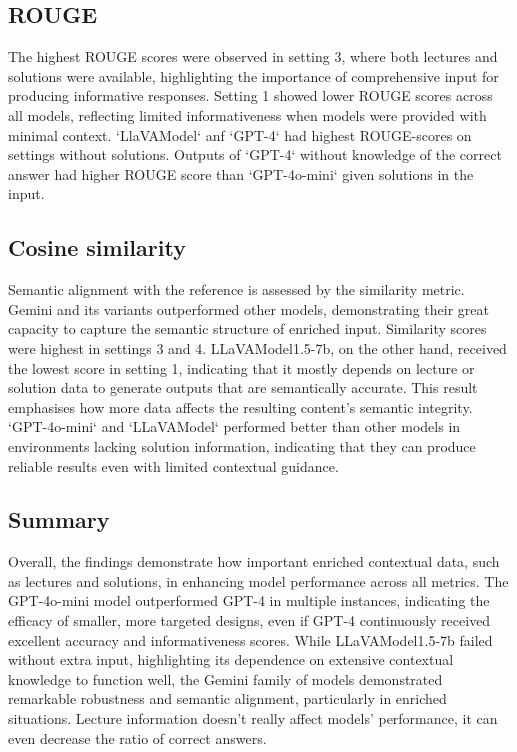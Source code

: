 \documentclass[10pt]{article}
\begin{document}
\subsection{ROUGE}
The highest ROUGE scores were observed in setting 3, where both lectures and solutions were available, highlighting the importance of comprehensive input for producing informative responses. Setting 1 showed lower ROUGE scores across all models, reflecting limited informativeness when models were provided with minimal context.  `LlaVAModel` anf `GPT-4` had highest ROUGE-scores on settings without solutions. Outputs of `GPT-4` without knowledge of the correct answer had higher ROUGE score than `GPT-4o-mini` given solutions in the input.


\subsection{Cosine similarity}
Semantic alignment with the reference is assessed by the similarity metric. Gemini and its variants outperformed other models, demonstrating their great capacity to capture the semantic structure of enriched input. Similarity scores were highest in settings 3 and 4. LLaVAModel1.5-7b, on the other hand, received the lowest score in setting 1, indicating that it mostly depends on lecture or solution data to generate outputs that are semantically accurate. This result emphasises how more data affects the resulting content's semantic integrity. `GPT-4o-mini` and `LLaVAModel` performed better than other models in environments lacking solution information, indicating that they can produce reliable results even with limited  contextual guidance.

\subsection{Summary}
Overall, the findings demonstrate how important enriched contextual data, such as lectures and solutions, in enhancing model performance across all metrics. The GPT-4o-mini model outperformed GPT-4 in multiple instances, indicating the efficacy of smaller, more targeted designs, even if GPT-4 continuously received excellent accuracy and informativeness scores. While LLaVAModel1.5-7b failed without extra input, highlighting its dependence on extensive contextual knowledge to function well, the Gemini family of models demonstrated remarkable robustness and semantic alignment, particularly in enriched situations.
Lecture information doesn’t really affect models’ performance, it can even decrease the ratio of correct answers.
\end{document}
